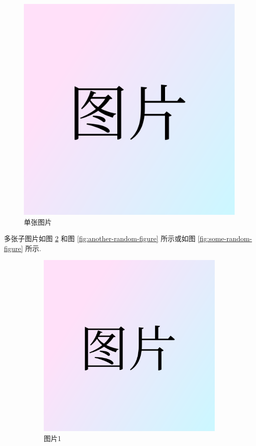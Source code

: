 \documentclass[UTF8,12pt,punct=kaiming,fontset=none]{ctexart}
\begin{document}
\begin{figure}[H]
    \includegraphics[width=0.3\linewidth]{figure.png}
    \caption{单张图片}
    \label{fig:a-figure}
\end{figure}

多张子图片如图 \ref{fig:a-random-figure} 和图 \ref{fig:another-random-figure} 所示或如图 \ref{fig:some-random-figure} 所示.

\begin{figure}[H]
    \begin{subfigure}{0.3\linewidth}
        \centering
        \includegraphics[width=\linewidth]{figure.png}
        \caption{图片1}
        \label{fig:a-random-figure}
    \end{subfigure}
    \hspace{1cm}
    \begin{subfigure}{0.3\linewidth}
        \centering

\end{subfigure}
\end{figure}
\end{document}

